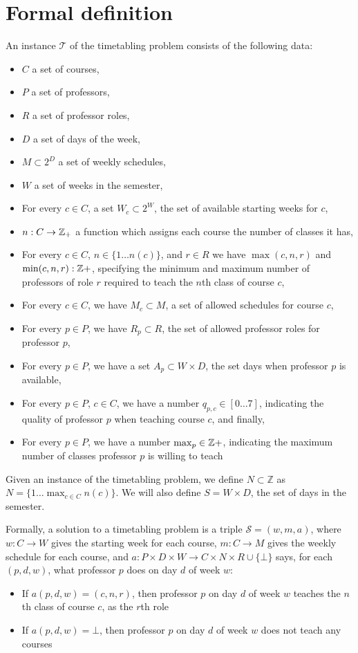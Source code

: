 \section{Formal definition}
An instance $\mathcal{T}$ of the timetabling problem consists of the following data:

\begin{itemize}
\item $C$ a set of courses,
\item $P$ a set of professors,
\item $R$ a set of professor roles,
\item $D$ a set of days of the week,
\item $M \subset 2^D$ a set of weekly schedules,
\item $W$ a set of weeks in the semester,
\item For every $c \in C$, a set $W_c \subset 2^W$, the set of available starting weeks for $c$,
\item $n: C \to \mathbb{Z}_+$ a function which assigns each course the number of classes it has,
\item For every $c \in C$, $n \in \{1 \dots n(c)\}$, and $r \in R$ we have $\max(c, n, r)$ and $\min(c, n, r): \mathbb{Z}+$, specifying the minimum and maximum number of professors of role $r$ required to teach the $n$th class of course $c$,
\item For every $c \in C$, we have $M_c \subset M$, a set of allowed schedules for course $c$,
\item For every $p \in P$, we have $R_p \subset R$, the set of allowed professor roles for professor $p$,
\item For every $p \in P$, we have a set $A_p \subset W \times D$, the set days when professor $p$ is available,
\item For every $p \in P$, $c \in C$, we have a number $q_{p, c} \in [0 \dots 7]$, indicating the quality of professor $p$ when teaching course $c$, and finally,
\item For every $p \in P$, we have a number $\max_p \in \mathbb{Z}+$, indicating the maximum number of classes professor $p$ is willing to teach
\end{itemize}


Given an instance of the timetabling problem, we define $N \subset \mathbb{Z}$ as $N = \{1 \dots \max_{c \in C} n(c)\}$. We will also define $S = W \times D$, the set of days in the semester.



Formally, a solution to a timetabling problem is a triple $\mathcal{S} = (w, m, a)$, where $w: C \to W$ gives the starting week for each course, $m: C \to M$ gives the weekly schedule for each course, and $a: P \times D \times W \to C \times N \times R \cup \{\bot\}$ says, for each $(p, d, w)$, what professor $p$ does on day $d$ of week $w$:
\begin{itemize}
\item If $a(p, d, w) = (c, n, r)$, then professor $p$ on day $d$ of week $w$ teaches the $n$th class of course $c$, as the $r$th role
\item If $a(p, d, w) = \bot$, then professor $p$ on day $d$ of week $w$ does not teach any courses
\end{itemize}

